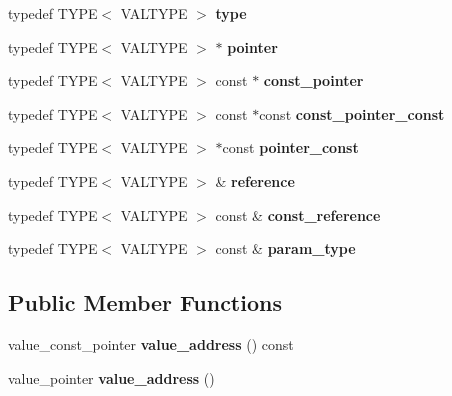 \begin{DoxyCompactItemize}
\mbox{\label{structglm_1_1detail_1_1genType_a17dbd44c7a86d09e6ea05b72cb02bccf}} 
typedef T\+Y\+PE$<$ V\+A\+L\+T\+Y\+PE $>$ {\bfseries type}
\item 
\mbox{\label{structglm_1_1detail_1_1genType_a0b4ddd0af4ae5665c60055e5b622808e}} 
typedef T\+Y\+PE$<$ V\+A\+L\+T\+Y\+PE $>$ $\ast$ {\bfseries pointer}
\item 
\mbox{\label{structglm_1_1detail_1_1genType_ade82fbfd7b15096223e1b133c148b5e2}} 
typedef T\+Y\+PE$<$ V\+A\+L\+T\+Y\+PE $>$ const  $\ast$ {\bfseries const\+\_\+pointer}
\item 
\mbox{\label{structglm_1_1detail_1_1genType_a4f3f1bc18abdbdba5757fc63052157fa}} 
typedef T\+Y\+PE$<$ V\+A\+L\+T\+Y\+PE $>$ const  $\ast$const {\bfseries const\+\_\+pointer\+\_\+const}
\item 
\mbox{\label{structglm_1_1detail_1_1genType_a4d7745054035d7efed18ec1d7215bbf0}} 
typedef T\+Y\+PE$<$ V\+A\+L\+T\+Y\+PE $>$ $\ast$const {\bfseries pointer\+\_\+const}
\item 
\mbox{\label{structglm_1_1detail_1_1genType_a14792cf03ce9cfb37becd2da5d9ae06a}} 
typedef T\+Y\+PE$<$ V\+A\+L\+T\+Y\+PE $>$ \& {\bfseries reference}
\item 
\mbox{\label{structglm_1_1detail_1_1genType_a509ca374a85f8a9ea319bc5a980d5f1a}} 
typedef T\+Y\+PE$<$ V\+A\+L\+T\+Y\+PE $>$ const  \& {\bfseries const\+\_\+reference}
\item 
\mbox{\label{structglm_1_1detail_1_1genType_a92c8b989f574a63d4e0f5bfc8a4f3a32}} 
typedef T\+Y\+PE$<$ V\+A\+L\+T\+Y\+PE $>$ const  \& {\bfseries param\+\_\+type}
\end{DoxyCompactItemize}
\subsection*{Public Member Functions}
\begin{DoxyCompactItemize}
\item 
\mbox{\label{structglm_1_1detail_1_1genType_a5dcc128cfa6f3fdc478d7169ec3cb71b}} 
value\+\_\+const\+\_\+pointer {\bfseries value\+\_\+address} () const
\item 
\mbox{\label{structglm_1_1detail_1_1genType_a146973ec142766743080c1895a9e3c65}} 
value\+\_\+pointer {\bfseries value\+\_\+address} ()
\end{DoxyCompactItemize}
